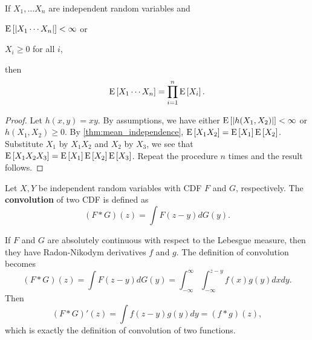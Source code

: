 \begin{corollary}
    If $X_1,\ldots X_n$ are independent random variables 
    and 
    \begin{thmenum}
        \item $\operatorname{E}\left[ {\left\lvert {X_1\cdots X_n} \right\rvert} \right] < \infty$ or 
        \item $X_i\geq 0$ for all $i$,  
    \end{thmenum}
    then 
    \begin{equation*}
        \operatorname{E}\left[ {X_1\cdots X_n} \right] = \prod_{i=1}^n\operatorname{E}\left[ {X_i} \right]. 
    \end{equation*}
\end{corollary}
\begin{proof}
    Let $h(x,y) = xy$. By assumptions, we have either 
    $\operatorname{E}\left[ {\left\lvert {h(X_1,X_2)} \right\rvert} \right]<\infty$ or $h(X_1,X_2)\geq 0$. 
    By \cref{thm:mean_independence}, $\operatorname{E}\left[ {X_1X_2} \right] = \operatorname{E}\left[ {X_1} \right]\operatorname{E}\left[ {X_2} \right]$. 
    Substitute $X_1$ by $X_1X_2$ and $X_2$ by $X_3$, we see that 
    $\operatorname{E}\left[ {X_1X_2X_3} \right] = \operatorname{E}\left[ {X_1} \right]\operatorname{E}\left[ {X_2} \right]\operatorname{E}\left[ {X_3} \right]$. 
    Repeat the procedure $n$ times and the result follows. 
\end{proof}

\begin{definition}
    Let $X, Y$ be independent random variables with CDF $F$ and $G$, respectively. 
    The \textbf{convolution} of two CDF is defined as 
    \begin{equation*}
        (F*G)(z) = \int F(z-y)dG(y). 
    \end{equation*}
\end{definition}
\begin{remark}
    If $F$ and $G$ are absolutely continuous with respect to 
    the Lebesgue measure, then they have Radon-Nikodym derivatives 
    $f$ and $g$. The definition of convolution becomes 
    \begin{equation*}
        (F*G)(z) = \int F(z-y)dG(y) = \int_{-\infty}^\infty\int_{-\infty}^{z-y}f(x)g(y)dxdy. 
    \end{equation*}
    Then 
    \begin{equation*}
        (F*G)'(z) = \int f(z-y)g(y)dy = (f*g)(z),
    \end{equation*}
    which is exactly the definition of convolution of two functions. 
\end{remark}


